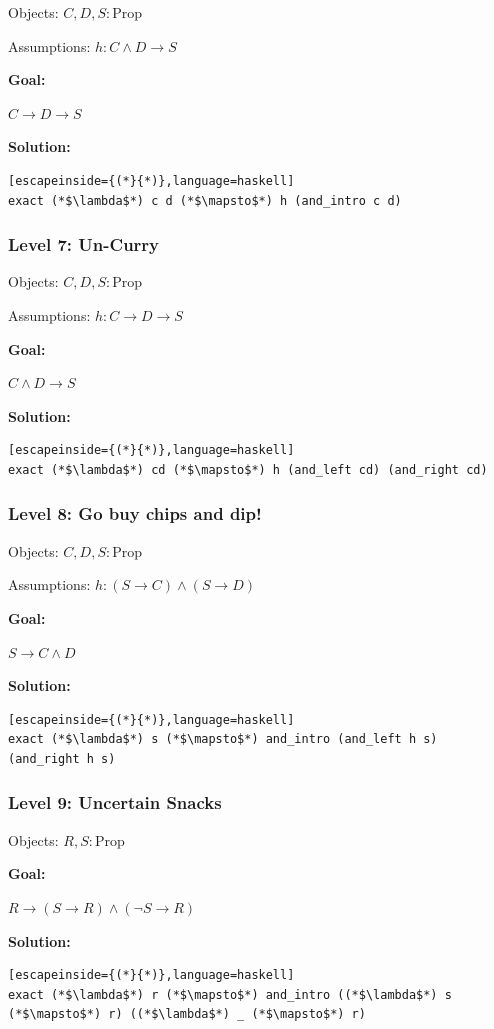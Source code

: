 \documentclass{article}
\theoremstyle{theorem}
\theoremstyle{definition}
\theoremstyle{remark}
\begin{document}
Objects:
$C, D, S: \text{Prop}$

Assumptions:
$h: C \land D \to S$

\textbf{Goal:}

$C \to D \to S$

\textbf{Solution:}
\begin{lstlisting}[escapeinside={(*}{*)},language=haskell]
exact (*$\lambda$*) c d (*$\mapsto$*) h (and_intro c d)
\end{lstlisting}

\subsubsection{Level 7: Un-Curry}

Objects:
$C, D, S: \text{Prop}$

Assumptions:
$h: C \to D \to S$

\textbf{Goal:}

$C \land D \to S$

\textbf{Solution:}
\begin{lstlisting}[escapeinside={(*}{*)},language=haskell]
exact (*$\lambda$*) cd (*$\mapsto$*) h (and_left cd) (and_right cd)
\end{lstlisting}

\subsubsection{Level 8: Go buy chips and dip!}

Objects:
$C, D, S: \text{Prop}$

Assumptions:
$h: (S \to C) \land (S \to D)$

\textbf{Goal:}

$S \to C \land D$

\textbf{Solution:}
\begin{lstlisting}[escapeinside={(*}{*)},language=haskell]
exact (*$\lambda$*) s (*$\mapsto$*) and_intro (and_left h s) (and_right h s)
\end{lstlisting}

\subsubsection{Level 9: Uncertain Snacks}

Objects:
$R, S: \text{Prop}$

\textbf{Goal:}

$R \to (S \to R) \land (\neg S \to R)$

\textbf{Solution:}
\begin{lstlisting}[escapeinside={(*}{*)},language=haskell]
exact (*$\lambda$*) r (*$\mapsto$*) and_intro ((*$\lambda$*) s (*$\mapsto$*) r) ((*$\lambda$*) _ (*$\mapsto$*) r)
\end{lstlisting}
\end{document}
